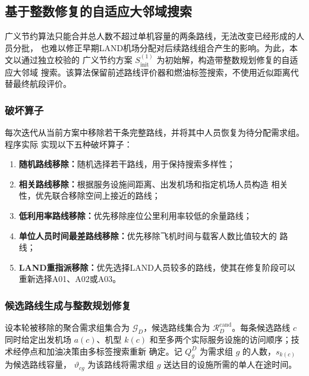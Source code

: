 
\subsection{基于整数修复的自适应大邻域搜索}

广义节约算法只能合并总人数不超过单机容量的两条路线，无法改变已经形成的人员分批，
也难以修正早期LAND机场分配对后续路线组合产生的影响。为此，本文以通过独立校验的
广义节约方案 $S_{\mathrm{init}}^{(1)}$ 为初始解，构造带整数规划修复的自适应大邻域
搜索。该算法保留前述路线评价器和燃油标签搜索，不使用近似距离代替最终航段评价。

\subsubsection{破坏算子}

每次迭代从当前方案中移除若干条完整路线，并将其中人员恢复为待分配需求组。程序实际
实现以下五种破坏算子：
\begin{enumerate}[label=\arabic*.]
  \item \textbf{随机路线移除：}随机选择若干路线，用于保持搜索多样性；
  \item \textbf{相关路线移除：}根据服务设施间距离、出发机场和指定机场人员构造
        相关性，优先联合移除空间上接近的路线；
  \item \textbf{低利用率路线移除：}优先移除座位公里利用率较低的余量路线；
  \item \textbf{单位人员时间最差路线移除：}优先移除飞机时间与载客人数比值较大的
        路线；
  \item \textbf{LAND重指派移除：}优先选择LAND人员较多的路线，使其在修复阶段可以
        重新选择A01、A02或A03。
\end{enumerate}

\subsubsection{候选路线生成与整数规划修复}

设本轮被移除的聚合需求组集合为 $\mathcal G_D$，候选路线集合为
$\mathcal R_D^{\mathrm{cand}}$。每条候选路线 $c$ 同时给定出发机场 $a(c)$、机型
$k(c)$ 和至多两个实际服务设施的访问顺序；技术经停点和加油决策由多标签搜索重新
确定。记 $Q_g^D$ 为需求组 $g$ 的人数，$s_{k(c)}$ 为候选路线容量，
$\vartheta_{cg}$ 为该路线将需求组 $g$ 送达目的设施所需的单人在途时间。

